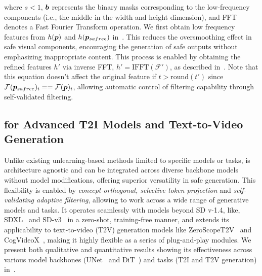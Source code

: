 where $s < 1$, $\boldsymbol{b}$ represents the binary masks corresponding to the low-frequency components (i.e., the middle in the width and height dimension), and FFT denotes a Fast Fourier Transform operation. We first obtain low frequency features from $h(\boldsymbol{p})$ and $h(\boldsymbol{p}_{safree})$ in~. This reduces the oversmoothing effect in safe visual components, encouraging the generation of safe outputs without emphasizing inappropriate content. This process is enabled by obtaining the refined features $h'$ via inverse FFT, $h'=\text{IFFT}(\mathcal{F}')$, as described in~. Note that this equation doesn't affect the original feature if $t > \text{round}(t')$ since $\mathcal{F}({\boldsymbol{p}_{safree}})_{i}==\mathcal{F}({\boldsymbol{p}})_i$, allowing automatic control of filtering capability through self-validated filtering.



\subsection{\ours{} for Advanced T2I Models and Text-to-Video Generation}\label{sec:subsec:video_generation}
Unlike existing unlearning-based methods limited to specific models or tasks, \ours{} is architecture agnostic and can be integrated across diverse backbone models without model modifications, offering superior versatility in safe generation. 
This flexibility is enabled by \textit{concept-orthogonal, selective token projection} and \textit{self-validating adaptive filtering}, allowing \ours{} to work across a wide range of generative models and tasks. 
It operates seamlessly with models beyond SD v-1.4, like, SDXL~\citep{podell2023sdxl} and SD-v3~\citep{2024sdv3} in a zero-shot, training-free manner, and extends its applicability to text-to-video (T2V) generation models like ZeroScopeT2V~\citep{2023zeroscope} and CogVideoX~\citep{yang2024cogvideox}, making it highly flexible as a series of plug-and-play modules. 
We present both qualitative and quantitative results showing its effectiveness across various model backbones (UNet~\citep{ronneberger2015u} and DiT~\citep{peebles2023scalable}) and tasks (T2I and T2V generation) in~.
